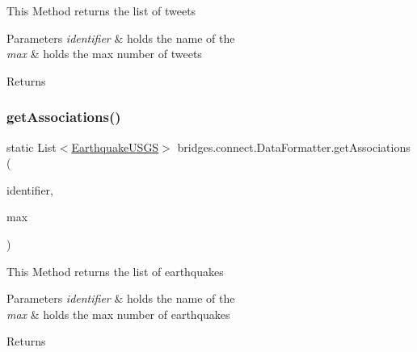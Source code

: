 This Method returns the list of tweets 
\begin{DoxyParams}{Parameters}
{\em identifier} & holds the name of the \\
\hline
{\em max} & holds the max number of tweets \\
\hline
\end{DoxyParams}
\begin{DoxyReturn}{Returns}

\end{DoxyReturn}
\mbox{\label{classbridges_1_1connect_1_1_data_formatter_abdcbc3c914dc045cb532fae291d4f3a5}} 
\subsubsection{\texorpdfstring{getAssociations()}{getAssociations()}\hspace{0.1cm}{\footnotesize\ttfamily [3/5]}}
{\footnotesize\ttfamily static List$<$\mbox{\hyperlink{classbridges_1_1data__src__dependent_1_1_earthquake_u_s_g_s}{Earthquake\+U\+S\+GS}}$>$ bridges.\+connect.\+Data\+Formatter.\+get\+Associations (\begin{DoxyParamCaption}\item[{\mbox{\hyperlink{classbridges_1_1data__src__dependent_1_1_u_s_g_saccount}{U\+S\+G\+Saccount}}}]{identifier,  }\item[{int}]{max }\end{DoxyParamCaption})\hspace{0.3cm}{\ttfamily [static]}}

This Method returns the list of earthquakes 
\begin{DoxyParams}{Parameters}
{\em identifier} & holds the name of the \\
\hline
{\em max} & holds the max number of earthquakes \\
\hline
\end{DoxyParams}
\begin{DoxyReturn}{Returns}

\end{DoxyReturn}
\mbox{\label{classbridges_1_1connect_1_1_data_formatter_a5e9f400a020b99e0bbba1fd5332a8f88}} 

